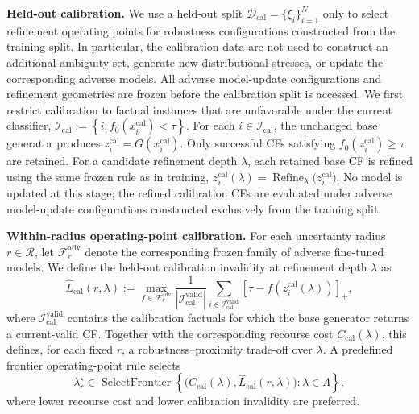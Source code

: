 \textbf{Held-out calibration.}
We use a held-out split
$\mathcal{D}_{\mathrm{cal}}=\{\xi_i\}_{i=1}^{N}$
only to select refinement operating points for robustness configurations
constructed from the training split. In particular, the calibration data are
not used to construct an additional ambiguity set, generate new
distributional stresses, or update the corresponding adverse models.
All adverse model-update configurations and refinement geometries are frozen
before the calibration split is accessed. We first restrict calibration to factual instances that are unfavorable under
the current classifier,
$
\mathcal{I}_{\mathrm{cal}}
:=
\left\{
i:
f_0(x_i^{\mathrm{cal}})<\tau
\right\}.
$
For each $i\in\mathcal{I}_{\mathrm{cal}}$, the unchanged base generator
produces
$
z_i^{\mathrm{cal}}
=
G(x_i^{\mathrm{cal}}).
$
Only successful CFs satisfying
$f_0(z_i^{\mathrm{cal}})\geq\tau$
are retained. For a candidate refinement depth $\lambda$, each retained
base CF is refined using the same frozen rule as in training,
$
z_i^{\mathrm{cal}}(\lambda)
=
\operatorname{Refine}_{\lambda}
\bigl(z_i^{\mathrm{cal}}\bigr).
$
No model is updated at this stage; the refined calibration CFs are evaluated
under adverse model-update configurations constructed exclusively from the
training split.

\textbf{Within-radius operating-point calibration.}
For each uncertainty radius $r\in\mathcal{R}$, let
$\mathcal{F}_{r}^{\mathrm{adv}}$
denote the corresponding frozen family of adverse fine-tuned models. We define
the held-out calibration invalidity at refinement depth $\lambda$ as
\begin{equation}
\widehat L_{\mathrm{cal}}(r,\lambda)
:=
\max_{f\in\mathcal{F}_{r}^{\mathrm{adv}}}
\frac{1}{|\mathcal{I}_{\mathrm{cal}}^{\mathrm{valid}}|}
\sum_{i\in\mathcal{I}_{\mathrm{cal}}^{\mathrm{valid}}}
\left[
\tau
-
f\!\left(
z_i^{\mathrm{cal}}(\lambda)
\right)
\right]_+ ,
\label{eq:heldout_calibration_invalidity}
\end{equation}
where
$\mathcal{I}_{\mathrm{cal}}^{\mathrm{valid}}$
contains the calibration factuals for which the base generator returns a
current-valid CF. Together with the corresponding recourse cost
$C_{\mathrm{cal}}(\lambda)$, this defines, for each fixed $r$, a
robustness--proximity trade-off over $\lambda$. A predefined frontier
operating-point rule selects
\[
\lambda_r^\star
\in
\operatorname{SelectFrontier}
\left\{
\bigl(
C_{\mathrm{cal}}(\lambda),
\widehat L_{\mathrm{cal}}(r,\lambda)
\bigr)
:
\lambda\in\Lambda
\right\},
\]
where lower recourse cost and lower calibration invalidity are preferred.

